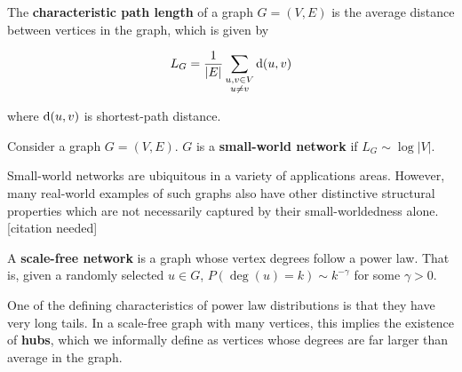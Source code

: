 \begin{definition}
  The \textbf{characteristic path length} of a graph $G = (V,E)$ is the average
  distance between vertices in the graph, which is given by

  \[ L_G = \frac{1}{|E|} \sum_{\substack{u,v \in V \\ u \neq v}} \mathrm{d}(u,v)\]

  where $\mathrm{d}(u,v)$ is shortest-path distance. 
\end{definition}

\begin{definition}
  Consider a graph $G = (V,E)$. $G$ is a \textbf{small-world network} if
  $L_G \sim \log{|V|}$.
\end{definition}

Small-world networks are ubiquitous in a variety of applications areas. However,
many real-world examples of such graphs also have other distinctive structural
properties which are not necessarily captured by their small-worldedness alone.
[citation needed]





\begin{definition}
  A \textbf{scale-free network} is a graph whose vertex degrees follow a power
  law. That is, given a randomly selected $u \in G$,
  $P(\deg(u) = k) \sim k^{-\gamma}$ for some $\gamma > 0$.
\end{definition}

One of the defining characteristics of power law distributions is that they have
very long tails. In a scale-free graph with many vertices, this implies the
existence of \textbf{hubs}, which we informally define as vertices whose degrees
are far larger than average in the graph.

